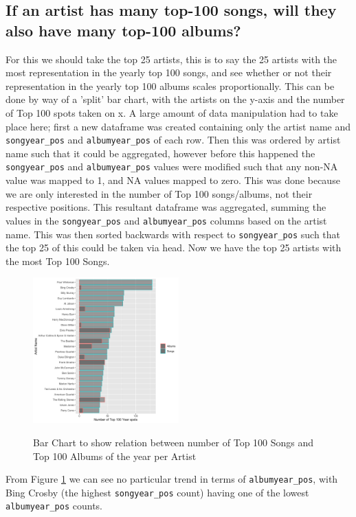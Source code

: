 \documentclass[12pt]{article}
\newcommand{\myfig}{\begin{figure}}
\begin{document}
    \subsection{If an artist has many top-100 songs, will they also have many top-100 albums?}
        For this we should take the top 25 artists, this is to say the 25 artists with the most representation in the yearly top 100 songs, and see whether or not their representation in the yearly top 100 albums scales proportionally.
        This can be done by way of a 'split' bar chart, with the artists on the y-axis and the number of Top 100 spots taken on x.
        A large amount of data manipulation had to take place here; first a new dataframe was created containing only the artist name and \verb|songyear_pos| and \verb|albumyear_pos| of each row.
        Then this was ordered by artist name such that it could be aggregated, however before this happened the \verb|songyear_pos| and \verb|albumyear_pos| values were modified such that any non-NA value was mapped to 1, and NA values mapped to zero.
        This was done because we are only interested in the number of Top 100 songs/albums, not their respective positions.
        This resultant dataframe was aggregated, summing the values in the \verb|songyear_pos| and \verb|albumyear_pos| columns based on the artist name.
        This was then sorted backwards with respect to \verb|songyear_pos| such that the top 25 of this could be taken via head.
        Now we have the top 25 artists with the most Top 100 Songs.
        \myfig
          \caption{Bar Chart to show relation between number of Top 100 Songs and Top 100 Albums of the year per Artist}
          \includegraphics[width=0.5\textwidth]{songAlbum}
          \label{fig:q5}
        \end{figure}

        From Figure \ref{fig:q5} we can see no particular trend in terms of \verb|albumyear_pos|, with Bing Crosby (the highest \verb|songyear_pos| count) having one of the lowest \verb|albumyear_pos| counts.
\end{document}

